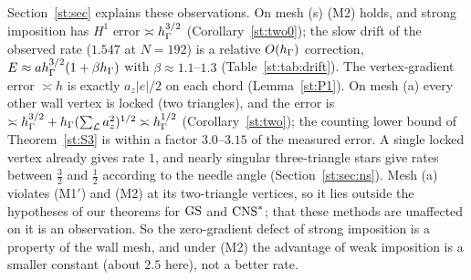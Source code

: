 \begin{remark}\label{num:rem:strong}
Section~\ref{st:sec} explains these observations. On mesh (s) (M2) holds, and strong imposition has $H^1$ error $\asymp h_\Gamma^{3/2}$ (Corollary~\ref{st:two0}); the slow drift of the observed rate ($1.547$ at $N=192$) is a relative $O(h_\Gamma)$ correction, $E\approx ah_\Gamma^{3/2}(1+\beta h_\Gamma)$ with $\beta\approx1.1$--$1.3$ (Table~\ref{st:tab:drift}). The vertex-gradient error $\asymp h$ is exactly $a_z|e|/2$ on each chord (Lemma~\ref{st:P1}). On mesh (a) every other wall vertex is locked (two triangles), and the error is $\asymp h_\Gamma^{3/2}+h_\Gamma(\sum_{\mathcal L}a_z^2)^{1/2}\asymp h_\Gamma^{1/2}$ (Corollary~\ref{st:two}); the counting lower bound of Theorem~\ref{st:S3} is within a factor $3.0$--$3.15$ of the measured error. A single locked vertex already gives rate $1$, and nearly singular three-triangle stars give rates between $\frac32$ and $\frac12$ according to the needle angle (Section~\ref{st:sec:ns}). Mesh (a) violates (M1$'$) and (M2) at its two-triangle vertices, so it lies outside the hypotheses of our theorems for $\mathrm{GS}$ and $\mathrm{CNS}^\ast$; that these methods are unaffected on it is an observation. So the zero-gradient defect of strong imposition is a property of the wall mesh, and under (M2) the advantage of weak imposition is a smaller constant (about $2.5$ here), not a better rate.
\end{remark}

